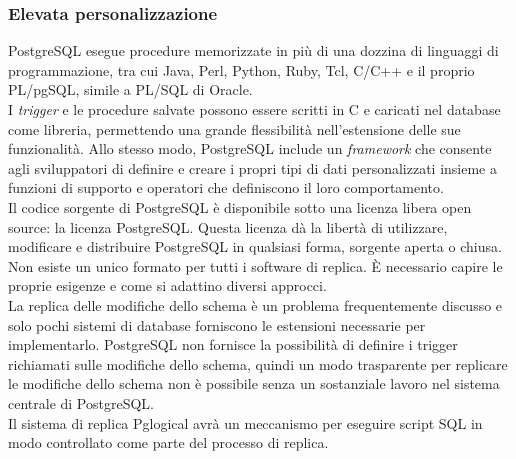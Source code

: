 \subsubsection{Elevata personalizzazione}
PostgreSQL esegue procedure memorizzate in pi\`{u} di una dozzina di linguaggi di programmazione, tra cui Java, Perl, Python, Ruby, Tcl, C/C++ e il proprio PL/pgSQL, simile a PL/SQL di Oracle. \\
I \textit{trigger} e le procedure salvate possono essere scritti in C e caricati nel database come libreria, permettendo una grande flessibilit\`{a} nell'estensione delle sue funzionalit\`{a}. Allo stesso modo, PostgreSQL include un \textit{framework} che consente agli sviluppatori di definire e creare i propri tipi di dati personalizzati insieme a funzioni di supporto e operatori che definiscono il loro comportamento.\\

Il codice sorgente di PostgreSQL \`{e} disponibile sotto una licenza libera open source: la licenza PostgreSQL. Questa licenza d\`{a} la libert\`{a} di utilizzare, modificare e distribuire PostgreSQL in qualsiasi forma, sorgente aperta o chiusa.\cite{etichetta15}\\

Non esiste un unico formato per tutti i software di replica. \`{E} necessario capire le proprie esigenze e come si adattino diversi approcci.\\

La replica delle modifiche dello schema \`{e} un problema frequentemente discusso e solo pochi sistemi di database forniscono le estensioni necessarie per implementarlo. PostgreSQL non fornisce la possibilit\`{a} di definire i trigger richiamati sulle modifiche dello schema, quindi un modo trasparente per replicare le modifiche dello schema non \`{e} possibile senza un sostanziale lavoro nel sistema centrale di PostgreSQL.\\
Il sistema di replica Pglogical avr\`{a} un meccanismo per eseguire script SQL in modo controllato come parte del processo di replica.

